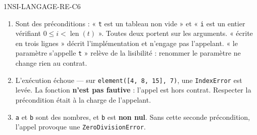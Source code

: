 \begin{corrige}{1NSI-LANGAGE-RE-C6}
\begin{enumerate}
  \item Sont des préconditions : « \lstinline{t} est un tableau non vide » et
        « \lstinline{i} est un entier vérifiant $0 \leq i < \operatorname{len}(t)$ ». Toutes
        deux portent sur les arguments.
        « écrite en trois lignes » décrit l'implémentation et n'engage pas l'appelant.
        « le paramètre s'appelle \lstinline{t} » relève de la lisibilité : renommer le
        paramètre ne change rien au contrat.
  \item L'exécution échoue — sur \lstinline{element([4, 8, 15], 7)}, une \lstinline{IndexError}
        est levée. La fonction \textbf{n'est pas fautive} : l'appel est hors contrat.
        Respecter la précondition était à la charge de l'appelant.
  \item \lstinline{a} et \lstinline{b} sont des nombres, et \lstinline{b} est \textbf{non nul}.
        Sans cette seconde précondition, l'appel provoque une \lstinline{ZeroDivisionError}.
\end{enumerate}
\end{corrige}
